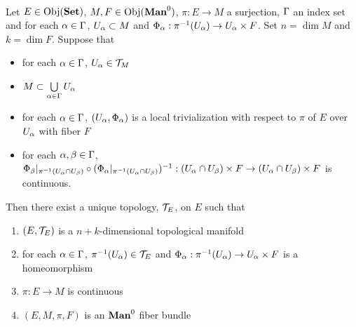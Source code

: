 \documentclass{book}
\begin{document}
	\begin{ex}   \\
		Let $E \in \operatorname{Obj}(\operatorname*{\text{\textbf{Set}}})$, $M, F \in \Obj(\Man0)$, $\pi: E \rightarrow M$ a surjection, $\Gamma$ an index set and for each $\alpha \in \Gamma$, $U_{\alpha} \subset M$ and $\Phi_{\alpha}: \pi^{-1}(U_{\alpha}) \rightarrow U_{\alpha} \times F$. Set $n = \dim M$ and $k = \dim F$. Suppose that 
		\begin{itemize}
			\item for each $\alpha \in \Gamma$, $U_{\alpha} \in \mathcal{T}_M$
			\item $M \subset \bigcup\limits_{\alpha \in \Gamma} U_{\alpha}$ 
			\item for each $\alpha \in \Gamma$, $(U_{\alpha}, \Phi_{\alpha})$ is a local trivialization with respect to $\pi$ of $E$ over $U_{\alpha}$ with fiber $F$ 
			\item for each $\alpha,\beta \in \Gamma$, $\Phi_{\beta}|_{\pi^{-1}(U_{\alpha} \cap U_{\beta})} \circ (\Phi_{\alpha}|_{\pi^{-1}(U_{\alpha} \cap U_{\beta})})^{-1}: (U_{\alpha} \cap U_{\beta}) \times F \rightarrow  (U_{\alpha} \cap U_{\beta}) \times F$ is continuous.
		\end{itemize}
		Then there exist a unique topology, $\mathcal{T}_E$, on $E$ such that
		\begin{enumerate}
			\item $(E, \mathcal{T}_E)$ is a $n+k$-dimensional topological manifold 
			\item for each $\alpha \in \Gamma$, $ \pi^{-1}(U_{\alpha}) \in \mathcal{T}_E$ and $\Phi_{\alpha}: \pi^{-1}(U_{\alpha}) \rightarrow U_{\alpha} \times F$ is a homeomorphism
			\item $\pi: E \rightarrow M$ is continuous
			\item $(E, M, \pi, F)$ is an $\Man0$ fiber bundle
		\end{enumerate}
	\end{ex}
	
\end{document}
